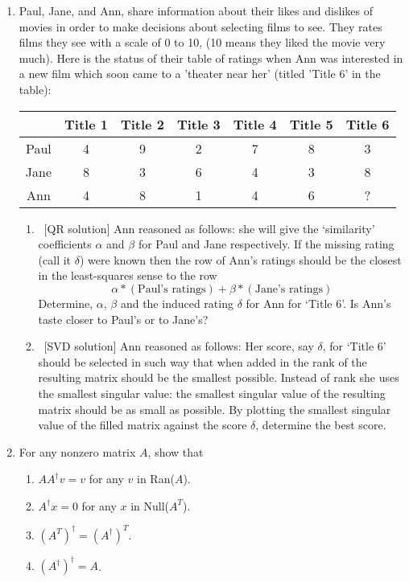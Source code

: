 \documentclass[11pt]{article}
\begin{document}
\begin{enumerate}
	\item Paul, Jane, and Ann, share information about their likes and dislikes of movies in order to make decisions about selecting films to see. They rates films they see with a scale of 0 to 10, (10 means they liked the movie very much). Here is the status of their table of ratings when Ann was interested in a new film which soon came to a ’theater near her’ (titled ’Title 6’ in the table):
	      \begin{center}
		      \begin{tabular}{|c|c|c|c|c|c|c|}
			      \hline
			           & Title 1 & Title 2 & Title 3 & Title 4 & Title 5 & Title 6 \\
			      \hline
			      Paul & 4       & 9       & 2       & 7       & 8       & 3       \\
			      \hline
			      Jane & 8       & 3       & 6       & 4       & 3       & 8       \\
			      \hline
			      Ann  & 4       & 8       & 1       & 4       & 6       & ?       \\
			      \hline
		      \end{tabular}
	      \end{center}
	      \begin{enumerate}
		      \item\ [QR solution] Ann reasoned as follows: she will give the `similarity’ coefficients \(\alpha\) and \(\beta\) for Paul and Jane respectively.  If the missing rating (call it \(\delta\)) were known then the row of Ann’s ratings should be the closest in the least-squares sense to the row
		      \[\alpha * (\text{Paul's ratings}) + \beta * (\text{Jane's ratings})\]
		      Determine, \(\alpha\), \(\beta\) and the induced rating \(\delta\) for Ann for `Title 6'.  Is Ann’s taste closer to Paul’s or to Jane’s?

		      \item\ [SVD solution] Ann reasoned as follows: Her score, say \(\delta\), for `Title 6' should be selected in such way that when added in the rank of the resulting matrix should be the smallest possible.  Instead of rank she uses the smallest singular value: the smallest singular value of the resulting matrix should be as small as possible.  By plotting the \color{red} smallest singular value \color{black} of the filled matrix against the score \(\delta\), determine the best score.
	      \end{enumerate}

	\item For any nonzero matrix \(A\), show that
	      \begin{enumerate}
		      \item \(AA^\dag v = v\) for any \(v\) in Ran(\(A\)).
		      \item \(A^\dag x = 0\) for any \(x\) in Null(\(A^T\)).
		      \item \((A^T)^\dag = (A^\dag)^T\).
		      \item \((A^\dag)^\dag = A\).
	      \end{enumerate}


\end{enumerate}
\end{document}
